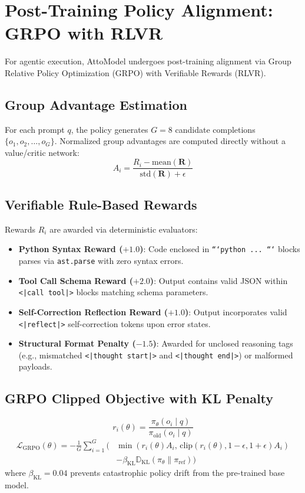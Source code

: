 \documentclass[10pt,twocolumn,letterpaper]{article}
\begin{document}
\section{Post-Training Policy Alignment: GRPO with RLVR}

For agentic execution, AttoModel undergoes post-training alignment via Group Relative Policy Optimization (GRPO) with Verifiable Rewards (RLVR).

\subsection{Group Advantage Estimation}
For each prompt $q$, the policy generates $G = 8$ candidate completions $\{o_1, o_2, \dots, o_G\}$. Normalized group advantages are computed directly without a value/critic network:
\begin{equation}
    A_i = \frac{R_i - \text{mean}(\mathbf{R})}{\text{std}(\mathbf{R}) + \epsilon}
\end{equation}

\subsection{Verifiable Rule-Based Rewards}
Rewards $R_i$ are awarded via deterministic evaluators:
\begin{itemize}
    \item \textbf{Python Syntax Reward ($+1.0$)}: Code enclosed in \texttt{```python ... ```} blocks parses via \texttt{ast.parse} with zero syntax errors.
    \item \textbf{Tool Call Schema Reward ($+2.0$)}: Output contains valid JSON within \texttt{<|call tool|>} blocks matching schema parameters.
    \item \textbf{Self-Correction Reflection Reward ($+1.0$)}: Output incorporates valid \texttt{<|reflect|>} self-correction tokens upon error states.
    \item \textbf{Structural Format Penalty ($-1.5$)}: Awarded for unclosed reasoning tags (e.g., mismatched \texttt{<|thought start|>} and \texttt{<|thought end|>}) or malformed payloads.
\end{itemize}

\subsection{GRPO Clipped Objective with KL Penalty}
\begin{equation}
    r_i(\theta) = \frac{\pi_\theta(o_i \mid q)}{\pi_{\text{old}}(o_i \mid q)}
\end{equation}
\begin{align}
    \mathcal{L}_{\text{GRPO}}(\theta) = -\frac{1}{G} \sum_{i=1}^G \Big( &\min\left( r_i(\theta) A_i, \, \text{clip}(r_i(\theta), 1-\epsilon, 1+\epsilon) A_i \right) \nonumber \\
    &- \beta_{\text{KL}} \mathbb{D}_{\text{KL}}\left(\pi_\theta \parallel \pi_{\text{ref}}\right) \Big)
\end{align}
where $\beta_{\text{KL}} = 0.04$ prevents catastrophic policy drift from the pre-trained base model.
\end{document}
